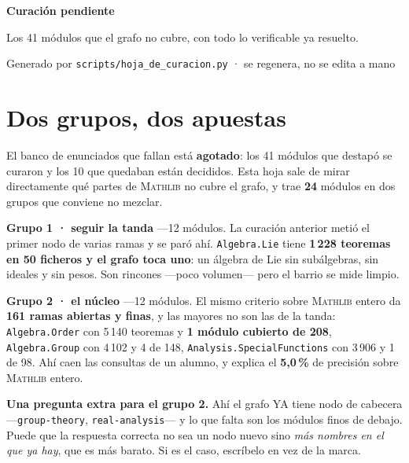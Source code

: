 \documentclass[10pt,a4paper]{article}
\newcommand{\Mathlib}{\textsc{Mathlib}}
\begin{document}
\begin{center}
{\LARGE\bfseries\color{acento} Curación pendiente}\par\smallskip
{\color{suave}\small Los 41 módulos que el grafo no cubre, con todo lo
verificable ya resuelto.}\par
{\color{suave}\footnotesize Generado por \texttt{scripts/hoja\_de\_curacion.py}
· se regenera, no se edita a mano}
\end{center}
\vspace{4pt}

\section*{Dos grupos, dos apuestas}

El banco de enunciados que fallan está \textbf{agotado}: los 41 módulos que
destapó se curaron y los 10 que quedaban están decididos. Esta hoja sale de
mirar directamente qué partes de \Mathlib{} no cubre el grafo, y trae
\textbf{24} módulos en dos grupos que conviene no
mezclar.\par\medskip
\textbf{Grupo 1 · seguir la tanda} —12 módulos. La
curación anterior metió el primer nodo de varias ramas y se paró ahí.
\texttt{Algebra.Lie} tiene \textbf{1\,228 teoremas en 50 ficheros y el grafo
toca uno}: un álgebra de Lie sin subálgebras, sin ideales y sin pesos. Son
rincones —poco volumen— pero el barrio se mide limpio.\par\medskip
\textbf{Grupo 2 · el núcleo} —12 módulos.
El mismo criterio sobre \Mathlib{} entero da \textbf{161 ramas abiertas y
finas}, y las mayores no son las de la tanda: \texttt{Algebra.Order} con
5\,140 teoremas y \textbf{1 módulo cubierto de 208}, \texttt{Algebra.Group}
con 4\,102 y 4 de 148, \texttt{Analysis.SpecialFunctions} con 3\,906 y 1 de
98. Ahí caen las consultas de un alumno, y explica el \textbf{5,0\,\%} de
precisión sobre \Mathlib{} entero.\par\medskip
\textbf{Una pregunta extra para el grupo 2.} Ahí el grafo YA tiene nodo de
cabecera —\texttt{group-theory}, \texttt{real-analysis}— y lo que falta son
los módulos finos de debajo. Puede que la respuesta correcta no sea un nodo
nuevo sino \emph{más nombres en el que ya hay}, que es más barato. Si es el
caso, escríbelo en vez de la marca.
\end{document}
